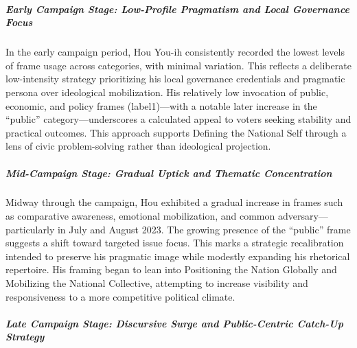 \documentclass[man,12pt]{apa7}
\begin{document}

\subparagraph{Early Campaign Stage: Low-Profile Pragmatism and Local Governance Focus}

In the early campaign period, Hou You-ih consistently recorded the lowest levels of frame usage across categories, with minimal variation. This reflects a deliberate low-intensity strategy prioritizing his local governance credentials and pragmatic persona over ideological mobilization. His relatively low invocation of public, economic, and policy frames (label1)—with a notable later increase in the ``public'' category—underscores a calculated appeal to voters seeking stability and practical outcomes. This approach supports Defining the National Self through a lens of civic problem-solving rather than ideological projection.

\subparagraph{Mid-Campaign Stage: Gradual Uptick and Thematic Concentration}

Midway through the campaign, Hou exhibited a gradual increase in frames such as comparative awareness, emotional mobilization, and common adversary—particularly in July and August 2023. The growing presence of the ``public'' frame suggests a shift toward targeted issue focus. This marks a strategic recalibration intended to preserve his pragmatic image while modestly expanding his rhetorical repertoire. His framing began to lean into Positioning the Nation Globally and Mobilizing the National Collective, attempting to increase visibility and responsiveness to a more competitive political climate.

\subparagraph{Late Campaign Stage: Discursive Surge and Public-Centric Catch-Up Strategy}
\end{document}

